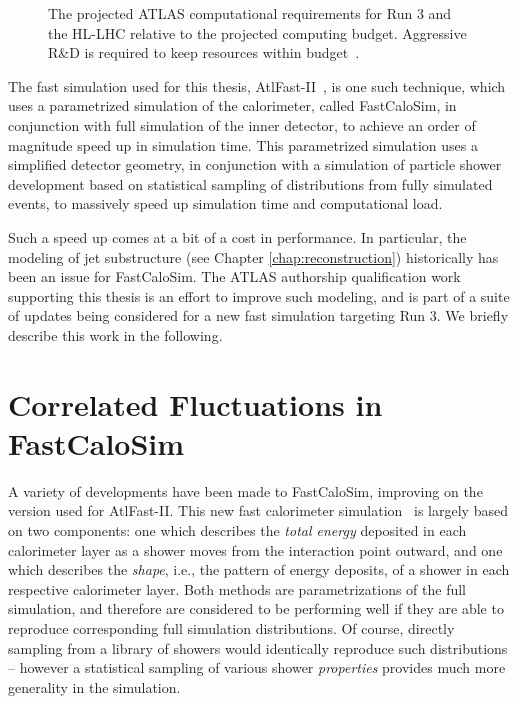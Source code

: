 \begin{figure}[ht]
\centering
{}
\caption{\label{fig:budget-plot} The projected ATLAS computational requirements for Run 3 and the HL-LHC 
relative to the projected computing budget. Aggressive R\&D is required to keep resources within 
budget~\cite{computing-budget}.}
\end{figure}

The fast simulation used for this thesis, AtlFast-II~\cite{SOFT-2010-01}, is one such technique, which uses
a parametrized simulation of the calorimeter, called FastCaloSim, in conjunction with full simulation of the 
inner detector, to achieve an order of magnitude speed up in simulation time. This parametrized simulation uses 
a simplified detector geometry, in conjunction with a simulation of particle shower development based on statistical 
sampling of distributions from fully simulated events, to massively speed up simulation time and computational load.

Such a speed up comes at a bit of a cost in performance. In particular, the modeling of jet substructure (see Chapter 
\ref{chap:reconstruction}) historically has been an issue for FastCaloSim. The ATLAS authorship qualification work 
supporting this thesis is an effort to improve such modeling, and is part of a suite of updates being considered for 
a new fast simulation targeting Run 3. We briefly describe this work in the following.

\FloatBarrier
\section{Correlated Fluctuations in FastCaloSim}
\label{shapepara}
A variety of developments have been made to FastCaloSim, improving on the version used 
for AtlFast-II. This new fast calorimeter simulation~\cite{ATL-SOFT-PUB-2018-002} is largely 
based on two components: one which describes the \emph{total energy} deposited in each calorimeter layer as a 
shower moves from the interaction point outward, and one which describes the \emph{shape}, i.e., the 
pattern of energy deposits, of a shower in each respective calorimeter layer. Both methods are 
parametrizations of the full simulation, and therefore are considered to be performing well if 
they are able to reproduce corresponding full simulation distributions. Of course, directly sampling 
from a library of showers would identically reproduce such distributions -- however a statistical 
sampling of various shower \emph{properties} provides much more generality in the simulation.

